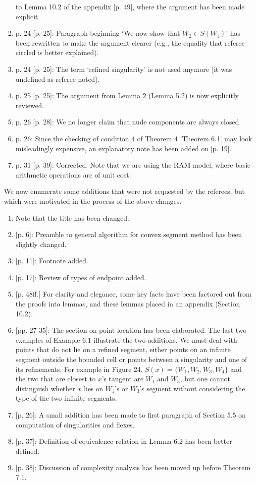 \begin{letter}
\begin{enumerate}
	to Lemma 10.2 of the appendix [p. 49], where the argument has been made explicit.
\item
	p. 24 [p. 25]: Paragraph beginning `We now show that $W_{2} \in S(W_{1})$'
	has been rewritten to make the argument clearer (e.g., the equality
	that referee circled is better explained).
\item
	p. 24 [p. 25]: The term `refined singularity' is not used anymore
	(it was undefined as referee noted).
\item
	p. 25 [p. 25]: The argument from Lemma 2 (Lemma 5.2) is now explicitly reviewed.
\item	
	p. 26 [p. 28]: We no longer claim that nude components are always closed.
\item
	p. 26: Since the checking of condition 4 of Theorem 4 [Theorem 6.1] may
	look misleadingly expensive,
	an explanatory note has been added on [p. 19].
\item
	p. 31 [p. 39]: Corrected.  Note that we are using the RAM model, where basic
	arithmetic operations are of unit cost.
\end{enumerate}
\vspace{1in}

\noindent We now enumerate some additions that were not requested by the referees, but
which were motivated in the process of the above changes.

\begin{enumerate}
\item
	Note that the title has been changed.
\item
	{[p. 6]}: Preamble to general algorithm for convex segment method has been 
	slightly changed.
\item
	{[p. 11]}: Footnote added.
\item
	{[p. 17]}: Review of types of endpoint added.
\item
	{[p. 48ff.]} For clarity and elegance, some key facts have been factored out from 
	the proofs into lemmas, and these lemmas placed in an appendix (Section 10.2).
\item
	{[pp. 27-35]}: The section on point location has been elaborated.
	The last two examples of Example 6.1 illustrate the two additions.
	We must deal with points that do not lie on a refined segment, either
	points on an infinite segment outside the bounded cell
	or points between a singularity and one of its refinements.
	For example in Figure 24, $S(x) = \{W_{1},W_{2},W_{3},W_{4}\}$ and 
	the two that are closest to $x$'s tangent are $W_{1}$ and $W_{3}$, 
	but one cannot distinguish whether $x$ lies on $W_{1}$'s or $W_{3}$'s 
	segment without considering the type of the two infinite segments.
\item
	{[p. 26]}: A small addition has been made to first paragraph of Section 5.5
	on computation of singularities and flexes.
\item
	{[p. 37]}: Definition of equivalence relation in Lemma 6.2 has been better defined.
\item
	{[p. 38]}: Discussion of complexity analysis has been moved up before Theorem 7.1.
\end{enumerate}


\end{letter}
